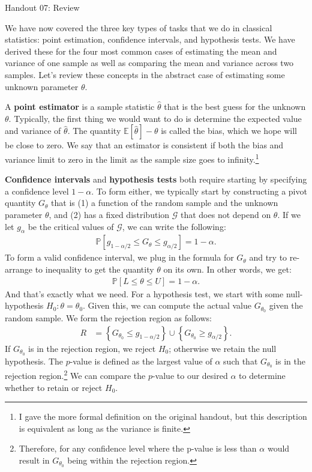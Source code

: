 \documentclass{tufte-handout}
\begin{document}
\justify

{\LARGE Handout 07: Review}

\vspace*{18pt}

\noindent
We have now covered the three key types of tasks that we do in
classical statistics: point estimation, confidence intervals, and
hypothesis tests. We have derived these for the four most common
cases of estimating the mean and variance of one sample as well as
comparing the mean and variance across two samples. Let's review
these concepts in the abstract case of estimating some unknown
parameter $\theta$.

A \textbf{point estimator} is a sample statistic $\hat{\theta}$ 
that is the best guess for the unknown $\theta$. Typically, the
first thing we would want to do is determine the expected value
and variance of $\hat{\theta}$. The quantity
$\mathbb{E}[\hat{\theta}] - \theta$ is called the bias, which
we hope will be close to zero. We say that an estimator is
consistent if both the bias and variance limit to zero in the
limit as the sample size goes to infinity.\footnote{
  I gave the more formal definition on the original handout,
  but this description is equivalent as long as the variance
  is finite.
}

\textbf{Confidence intervals} and \textbf{hypothesis tests}
both require starting by specifying a confidence level $1-\alpha$.
To form either, we typically start by constructing a pivot quantity
$G_\theta$ that is (1) a function of the random sample and the unknown
parameter $\theta$, and (2) has a fixed distribution $\mathcal{G}$
that does not depend on $\theta$. If we let $g_{\alpha}$ be the
critical values of $\mathcal{G}$, we can write the following:
\begin{align*}
\mathbb{P} \left[ g_{1 - \alpha/2} \leq G_\theta \leq g_{\alpha/2} \right] = 1 - \alpha.
\end{align*}
To form a valid confidence interval, we plug in the formula for $G_\theta$
and try to re-arrange to inequality to get the quantity $\theta$ on its
own. In other words, we get:
\begin{align*}
\mathbb{P} \left[ L \leq \theta \leq U \right] = 1 - \alpha.
\end{align*}
And that's exactly what we need. For a hypothesis test, we start with
some null-hypothesis $H_0: \theta = \theta_0$. Given this, we can
compute the actual value $G_{\theta_0}$ given the random sample. We
form the rejection region as follows:
\begin{align*}
R &= \left\{ G_{\theta_0} \leq g_{1-\alpha/2} \right\} \cup \left\{ G_{\theta_0} \geq g_{\alpha/2} \right\}.
\end{align*}
If $G_{\theta_0}$ is in the rejection region, we reject $H_0$; otherwise
we retain the null hypothesis. The $p$-value is defined as the
largest value of $\alpha$ such that $G_{\theta_0}$ is in the rejection
region.\footnote{
  Therefore, for any confidence level where the p-value is less than
  $\alpha$ would result in $G_{\theta_0}$ being within the rejection
  region. 
}
We can compare the $p$-value to our desired $\alpha$ to determine
whether to retain or reject $H_0$.
\end{document}
